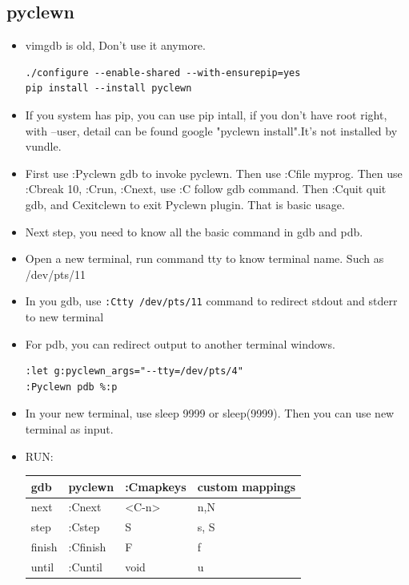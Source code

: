 \documentclass[a4paper,11pt,twoside]{book}
\begin{document}
\subsection{pyclewn}
\begin{itemize}
		\item vimgdb is old, Don't use it anymore.
\begin{verbatim}
./configure --enable-shared --with-ensurepip=yes 
pip install --install pyclewn
\end{verbatim}

		\item If you system has pip, you can use pip intall, if you don't have root right, with --user, detail can be found google "pyclewn install".It's not installed by vundle. 

		\item First use :Pyclewn gdb to invoke pyclewn. Then use :Cfile myprog. Then use :Cbreak 10, :Crun, :Cnext, use :C follow gdb command. Then :Cquit quit gdb, and Cexitclewn to exit Pyclewn plugin. That is basic usage. 

		\item Next step, you need to know all the basic command in gdb and pdb.

		\item Open a new terminal, run command tty to know terminal name. Such as /dev/pts/11

		\item In you gdb, use \verb!:Ctty /dev/pts/11! command to redirect stdout and stderr to new terminal

		\item For pdb, you can redirect output to another terminal windows.   
\begin{verbatim}
:let g:pyclewn_args="--tty=/dev/pts/4"
:Pyclewn pdb %:p
\end{verbatim}

		\item In your new terminal, use sleep 9999 or sleep(9999). Then you can use new terminal as input. 

		\item RUN: \\
\begin{tabular}{p{}|p{}|p{}|p{}}
		\hline 
		gdb & pyclewn & :Cmapkeys & custom mappings \\
		\hline
		next & :Cnext & <C-n> & n,N\\
		\hline 
		step & :Cstep & S& s, S\\
		\hline 
		finish & :Cfinish & F& f\\
		\hline
		until & :Cuntil & void& u\\
		\hline
\end{tabular}


\end{itemize}
\end{document}
